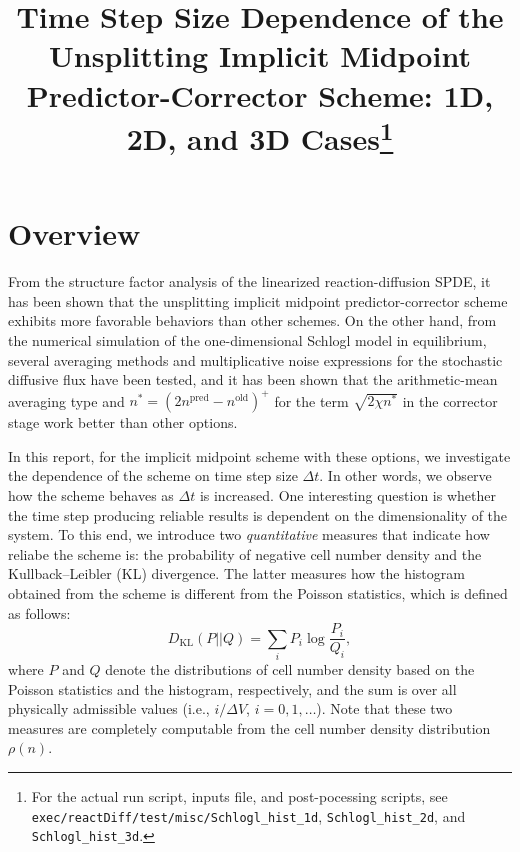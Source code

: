 \documentclass{article}
\begin{document}
\title{Time Step Size Dependence of the Unsplitting Implicit Midpoint Predictor-Corrector Scheme: 1D, 2D, and 3D Cases\footnote{For the actual run script, inputs file, and post-pocessing scripts, see \texttt{exec/reactDiff/test/misc/Schlogl\_hist\_1d}, \texttt{Schlogl\_hist\_2d}, and \texttt{Schlogl\_hist\_3d}.}}
\author{}
\date{}
\maketitle

\section{Overview}
From the structure factor analysis of the linearized reaction-diffusion SPDE, it has been shown that the unsplitting implicit midpoint predictor-corrector scheme exhibits more favorable behaviors than other schemes.
On the other hand, from the numerical simulation of the one-dimensional Schlogl model in equilibrium, several averaging methods and multiplicative noise expressions for the stochastic diffusive flux have been tested, and it has been shown that the arithmetic-mean averaging type and $n^*=\left(2 n^\mathrm{pred}-n^\mathrm{old}\right)^+$ for the term $\sqrt{2\chi n^*}$ in the corrector stage work better than other options.

In this report, for the implicit midpoint scheme with these options, we investigate the dependence of the scheme on time step size $\Delta t$.
In other words, we observe how the scheme behaves as $\Delta t$ is increased.
One interesting question is whether the time step producing reliable results is dependent on the dimensionality of the system.
To this end, we introduce two \textit{quantitative} measures that indicate how reliabe the scheme is: the probability of negative cell number density and the Kullback--Leibler (KL) divergence.
The latter measures how the histogram obtained from the scheme is different from the Poisson statistics, which is defined as follows:
\begin{equation}
\label{KLdiv}
D_\mathrm{KL}(P||Q)=\sum_i P_i \log \frac{P_i}{Q_i},
\end{equation}
where $P$ and $Q$ denote the distributions of cell number density based on the Poisson statistics and the histogram, respectively, and the sum is over all physically admissible values (i.e., $i/\Delta V$, $i=0,1,\dots$).
Note that these two measures are completely computable from the cell number density distribution $\rho(n)$.
\end{document}
